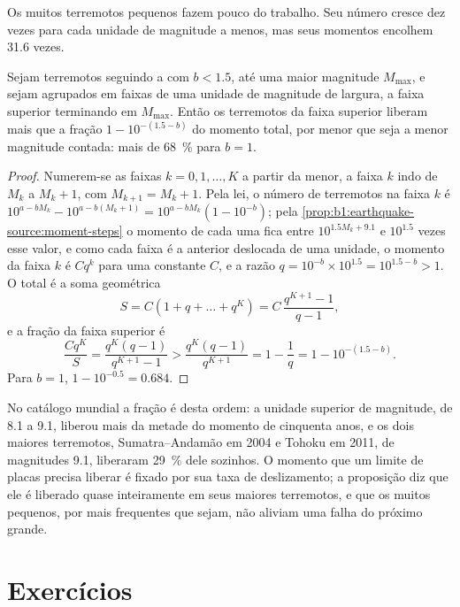 Os muitos terremotos pequenos fazem pouco do trabalho. Seu número cresce dez vezes para cada unidade de magnitude a menos, mas seus momentos encolhem 31.6 vezes.

\begin{proposition}\label{prop:b1:earthquake-source:largest}
Sejam terremotos seguindo a  com $b < 1.5$, até uma maior magnitude $M_{\max}$, e sejam agrupados em faixas de uma unidade de magnitude de largura, a faixa superior terminando em $M_{\max}$. Então os terremotos da faixa superior liberam mais que a fração $1 - 10^{-(1.5 - b)}$ do momento total, por menor que seja a menor magnitude contada: mais de \qty{68}{\percent} para $b = 1$.
\end{proposition}

\begin{proof}
Numerem-se as faixas $k = 0, 1, \dots, K$ a partir da menor, a faixa $k$ indo de $M_k$ a $M_k + 1$, com $M_{k+1} = M_k + 1$. Pela lei, o número de terremotos na faixa $k$ é $10^{a - bM_k} - 10^{a - b(M_k+1)} =
10^{a - bM_k}(1 - 10^{-b})$; pela \cref{prop:b1:earthquake-source:moment-steps}
o momento de cada uma fica entre $10^{1.5M_k + 9.1}$ e $10^{1.5}$ vezes esse valor, e como cada faixa é a anterior deslocada de uma unidade, o momento da faixa $k$ é $C q^k$ para uma constante $C$, e a razão
$q = 10^{-b}\times10^{1.5} = 10^{1.5 - b} > 1$. O total é a soma geométrica
\[
  S = C(1 + q + \dots + q^K) = C\,\frac{q^{K+1} - 1}{q - 1} ,
\]
e a fração da faixa superior é
\[
  \frac{C q^K}{S} = \frac{q^K (q - 1)}{q^{K+1} - 1}
  > \frac{q^K (q - 1)}{q^{K+1}} = 1 - \frac1q = 1 - 10^{-(1.5 - b)} .
\]
Para $b = 1$, $1 - 10^{-0.5} = 0.684$.
\end{proof}

No catálogo mundial a fração é desta ordem: a unidade superior de magnitude, de 8.1 a 9.1, liberou mais da metade do momento de cinquenta anos, e os dois maiores terremotos, Sumatra--Andamão em 2004 e Tohoku em 2011, de magnitudes 9.1, liberaram \qty{29}{\percent} dele sozinhos. O momento que um limite de placas precisa liberar é fixado por sua taxa de deslizamento; a proposição diz que ele é liberado quase inteiramente em seus maiores terremotos, e que os muitos pequenos, por mais frequentes que sejam, não aliviam uma falha do próximo grande.

\section{Exercícios}

